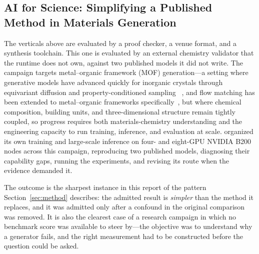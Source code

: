 \subsection{AI for Science: Simplifying a Published Method in Materials Generation}
\label{sec:materials-vertical}

The verticals above are evaluated by a proof checker, a venue format, and a
synthesis toolchain. This one is evaluated by an external chemistry validator that
the runtime does not own, against two published models it did not write. The
campaign targets metal--organic framework (MOF) generation---a setting where
generative models have advanced quickly for inorganic crystals through equivariant
diffusion and property-conditioned sampling
~\citep{jiao2023diffcsp,zeni2023mattergen}, and flow matching has been extended to
metal--organic frameworks specifically~\citep{kim2024mofflow}, but where chemical
composition, building units, and three-dimensional structure remain tightly coupled, so progress requires both materials-chemistry understanding and the
engineering capacity to run training, inference, and evaluation at scale. \systemname
organized its own training and large-scale inference on four- and eight-GPU NVIDIA
B200 nodes across this campaign, reproducing two published models, diagnosing their
capability gaps, running the experiments, and revising its route when the evidence
demanded it.

The outcome is the sharpest instance in this report of the pattern
Section~\ref{sec:method} describes: the admitted result is \emph{simpler} than the
method it replaces, and it was admitted only after a confound in the original
comparison was removed. It is also the clearest case of a research campaign in which
no benchmark score was available to steer by---the objective was to understand why a
generator fails, and the right measurement had to be constructed before the question
could be asked.

